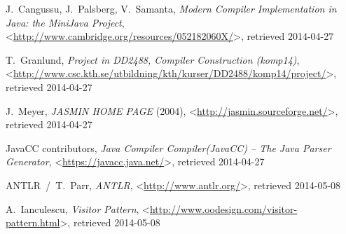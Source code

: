 \documentclass[a4paper]{article}
\begin{document}
\begin{thebibliography}{99}

    J.~Cangussu, J.~Palsberg, V.~Samanta,
    \emph{Modern Compiler Implementation in Java: the MiniJava Project},
    <\url{http://www.cambridge.org/resources/052182060X/}>, retrieved 2014-04-27

    T.~Granlund,
    \emph{Project in DD2488, Compiler Construction (komp14)},
    <\url{http://www.csc.kth.se/utbildning/kth/kurser/DD2488/komp14/project/}>, retrieved 2014-04-27

    J.~Meyer,
    \emph{JASMIN HOME PAGE} (2004),
    <\url{http://jasmin.sourceforge.net/}>, retrieved 2014-04-27

    JavaCC contributors,
    \emph{Java Compiler Compiler\texttrademark (JavaCC\texttrademark) -- The Java Parser Generator},
    <\url{https://javacc.java.net/}>, retrieved 2014-04-27

    ANTLR~/~T.~Parr,
    \emph{ANTLR},
    <\url{http://www.antlr.org/}>, retrieved 2014-05-08

    A.~Ianculescu,
    \emph{Visitor Pattern},
    <\url{http://www.oodesign.com/visitor-pattern.html}>, retrieved 2014-05-08

\end{thebibliography}
\end{document}
